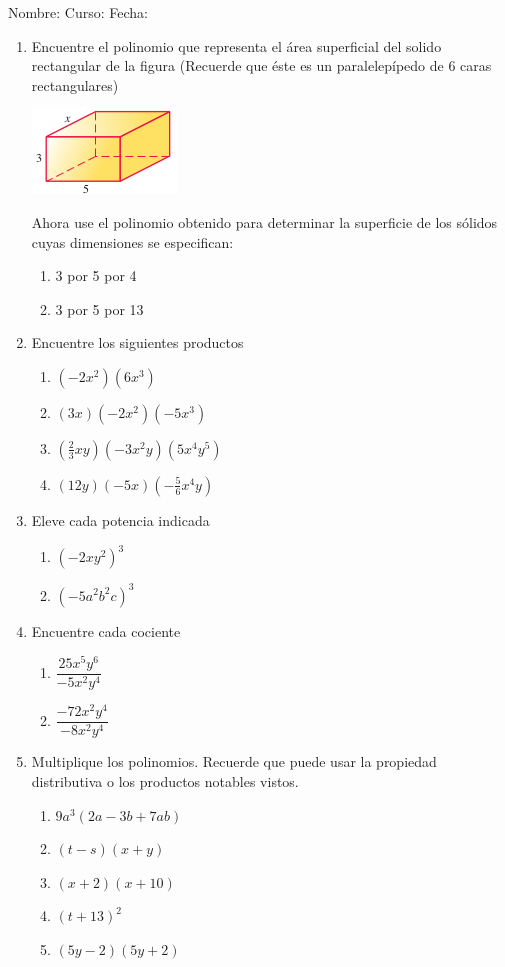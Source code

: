 \documentclass[letterpaper,fleqn]{article}
\newcommand{\LineaNombre}{%
\par
\vspace{\baselineskip}
Nombre:\hrulefill \; Curso: \underline{\hspace*{48pt}} \; Fecha: \underline{\hspace*{2.5cm}} \relax
\par}
\begin{document}
\LineaNombre
\begin{enumerate}
 \item Encuentre el polinomio que representa el área superficial del solido rectangular de la figura (Recuerde que \'{e}ste es un paralelep\'{i}pedo de 6 caras rectangulares)
\begin{center}
\includegraphics[scale=1]{Images/solido01.png} 
\end{center}
\noanswer
Ahora use el polinomio obtenido para determinar la superficie de los sólidos cuyas dimensiones se especifican:
\begin{enumerate}
\item 3 por 5 por 4\noanswer
\item 3 por 5 por 13\noanswer
\end{enumerate}
\item Encuentre los siguientes productos
\begin{enumerate}
\item $(-2x^{2})(6x^{3})$\noanswer
\item $(3x)(-2x^{2})(-5x^{3})$\noanswer
\item $(\frac{2}{3}xy)(-3x^{2}y)(5x^{4}y^{5})$\noanswer
\item $(12y)(-5x)(-\frac{5}{6}x^{4}y)$\noanswer
\end{enumerate}
\item Eleve cada potencia indicada
\begin{enumerate}
\item $(-2xy^{2})^{3}$\noanswer
\item $(-5a^{2}b^{2}c)^{3}$\noanswer
\end{enumerate}
\item Encuentre cada cociente
\begin{enumerate}
\item $\dfrac{25x^{5}y^{6}}{-5x^{2}y^{4}}$\noanswer
\item $\dfrac{-72x^{2}y^{4}}{-8x^{2}y^{4}}$\noanswer
\end{enumerate}
\item Multiplique los polinomios. Recuerde que puede usar la propiedad distributiva o los productos notables vistos.
\begin{enumerate}
\item $9a^{3}(2a-3b+7ab)$\noanswer
\item $(t-s)(x+y)$\noanswer
\item $(x+2)(x+10)$\noanswer
\item $(t+13)^{2}$\noanswer
\item $(5y-2)(5y+2)$\noanswer
\end{enumerate}
 \end{enumerate}
\end{document}

